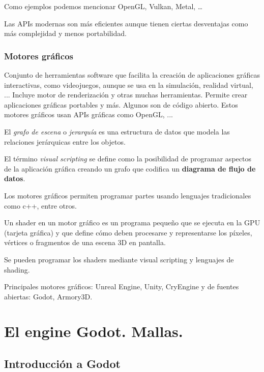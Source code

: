 \documentclass[12pt]{report} %
\begin{document}
Como ejemplos podemos mencionar OpenGL, Vulkan, Metal, \ldots{}

Las APIs modernas son más eficientes aunque tienen ciertas desventajas
como más complejidad y menos portabilidad.

\hypertarget{motores-gruxe1ficos}{%
\subsection{Motores gráficos}\label{motores-gruxe1ficos}}

\begin{definicion}
Conjunto de herramientas software que facilita la creación de aplicaciones gráficas interactivas, como videojuegos, aunque se usa en la simulación, realidad virtual, ... Incluye motor de renderización y otras muchas herramientas. Permite crear aplicaciones gráficas portables y más. Algunos son de código abierto. Estos motores gráficos usan APIs gráficas como OpenGL, ...
\end{definicion}

El \emph{grafo de escena} o \emph{jerarquía} es una estructura de datos
que modela las relaciones jerárquicas entre los objetos.

El término \emph{visual scripting} se define como la posibilidad de
programar aspectos de la aplicación gráfica creando un grafo que
codifica un \textbf{diagrama de flujo de datos}.

Los motores gráficos permiten programar partes usando lenguajes
tradicionales como c++, entre otros.

\begin{definicion}
Un shader en un motor gráfico es un programa pequeño que se ejecuta en la GPU (tarjeta gráfica) y que define cómo deben procesarse y representarse los píxeles, vértices o fragmentos de una escena 3D en pantalla.
\end{definicion}

Se pueden programar los shaders mediante visual scripting y lenguajes de
shading.

Principales motores gráficos: Unreal Engine, Unity, CryEngine y de
fuentes abiertas: Godot, Armory3D.

\hypertarget{el-engine-godot.-mallas.}{%
\chapter{El engine Godot. Mallas.}\label{el-engine-godot.-mallas.}}

\hypertarget{introducciuxf3n-a-godot}{%
\section{Introducción a Godot}\label{introducciuxf3n-a-godot}}
\end{document}
